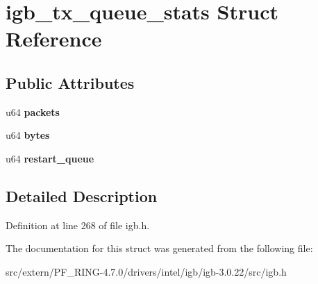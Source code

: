 \hypertarget{structigb__tx__queue__stats}{
\section{igb\_\-tx\_\-queue\_\-stats Struct Reference}
\label{structigb__tx__queue__stats}
}
\subsection*{Public Attributes}
\begin{DoxyCompactItemize}
\item 
\hypertarget{structigb__tx__queue__stats_a84ed3c95e0f76fde068b68af600d9c9d}{
u64 {\bfseries packets}}
\label{structigb__tx__queue__stats_a84ed3c95e0f76fde068b68af600d9c9d}

\item 
\hypertarget{structigb__tx__queue__stats_af119669dca8543f7a6cd82e71627bac9}{
u64 {\bfseries bytes}}
\label{structigb__tx__queue__stats_af119669dca8543f7a6cd82e71627bac9}

\item 
\hypertarget{structigb__tx__queue__stats_a625ef5ef3530956207fe548c25390c38}{
u64 {\bfseries restart\_\-queue}}
\label{structigb__tx__queue__stats_a625ef5ef3530956207fe548c25390c38}

\end{DoxyCompactItemize}


\subsection{Detailed Description}


Definition at line 268 of file igb.h.



The documentation for this struct was generated from the following file:\begin{DoxyCompactItemize}
\item 
src/extern/PF\_\-RING-\/4.7.0/drivers/intel/igb/igb-\/3.0.22/src/igb.h\end{DoxyCompactItemize}
